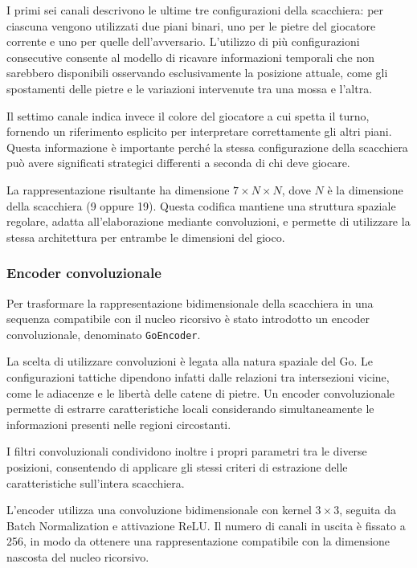 I primi sei canali descrivono le ultime tre configurazioni della
scacchiera: per ciascuna vengono utilizzati due piani binari, uno per
le pietre del giocatore corrente e uno per quelle dell'avversario.
L'utilizzo di più configurazioni consecutive consente al modello di
ricavare informazioni temporali che non sarebbero disponibili
osservando esclusivamente la posizione attuale, come gli spostamenti
delle pietre e le variazioni intervenute tra una mossa e l'altra.

Il settimo canale indica invece il colore del giocatore a cui spetta
il turno, fornendo un riferimento esplicito per interpretare
correttamente gli altri piani. Questa informazione è importante
perché la stessa configurazione della scacchiera può avere
significati strategici differenti a seconda di chi deve giocare.

La rappresentazione risultante ha dimensione $7 \times N \times N$,
dove $N$ è la dimensione della scacchiera (9 oppure 19). Questa
codifica mantiene una struttura spaziale regolare, adatta
all'elaborazione mediante convoluzioni, e permette di utilizzare
la stessa architettura per entrambe le dimensioni del gioco.

\subsubsection{Encoder convoluzionale}

Per trasformare la rappresentazione bidimensionale della scacchiera in una sequenza compatibile con il nucleo ricorsivo è stato introdotto un encoder convoluzionale, denominato \texttt{GoEncoder}.

La scelta di utilizzare convoluzioni è legata alla natura spaziale del Go. Le configurazioni tattiche dipendono infatti dalle relazioni tra intersezioni vicine, come le adiacenze e le libertà delle catene di pietre. Un encoder convoluzionale permette di estrarre caratteristiche locali considerando simultaneamente le informazioni presenti nelle regioni circostanti.

I filtri convoluzionali condividono inoltre i propri parametri tra le diverse posizioni, consentendo di applicare gli stessi criteri di estrazione delle caratteristiche sull'intera scacchiera.

L'encoder utilizza una convoluzione bidimensionale con kernel $3\times3$, seguita da Batch Normalization e attivazione ReLU. Il numero di canali in uscita è fissato a 256, in modo da ottenere una rappresentazione compatibile con la dimensione nascosta del nucleo ricorsivo.

